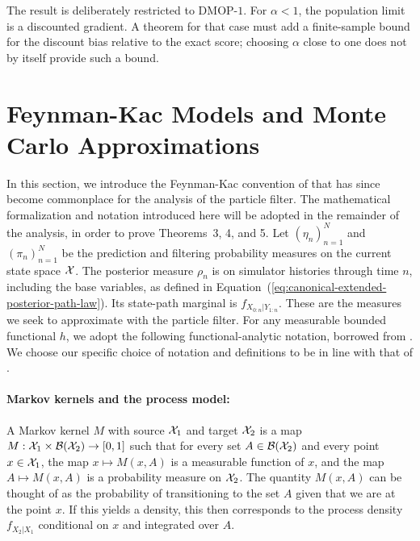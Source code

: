 \documentclass[11pt]{article}
\newcommand\thmMopTargeting{3}
\newcommand\thmMopGradConsistency{4}
\newcommand\thmMopBiasvar{5}
\theoremstyle{thmstylethree}%
\begin{document}
The result is deliberately restricted to DMOP-$1$.  For $\alpha<1$, the
population limit is a discounted gradient.  A theorem for that case must add a
finite-sample bound for the discount bias relative to the exact score; choosing
$\alpha$ close to one does not by itself provide such a bound.




\section{Feynman-Kac Models and Monte Carlo Approximations}
\label{appendix:feynman}




In this section, we introduce the Feynman-Kac convention of \cite{delMoral04} that has since become commonplace \citep{karjalainen23} for the analysis of the particle filter.
The mathematical formalization and notation introduced here will be adopted in the remainder of the analysis, in order to prove Theorems~{\thmMopTargeting}, \thmMopGradConsistency, and \thmMopBiasvar.
Let $(\eta_n)_{n=1}^N$ and $(\pi_n)_{n=1}^N$ be the prediction and filtering
probability measures on the current state space ${\mathcal{X}}$. The posterior measure
$\rho_n$ is on simulator histories through time $n$, including the base
variables, as defined in Equation~(\ref{eq:canonical-extended-posterior-path-law}).
Its state-path marginal is $f_{X_{0:n}|Y_{1:n}}$. These are the measures
we seek to approximate with the particle filter.
For any measurable bounded functional $h$, we adopt the following functional-analytic notation, borrowed from \cite{delMoral04, chopin20, karjalainen23}.
We choose our specific choice of notation and definitions to be in line with that of \cite{karjalainen23}. 


\paragraph{\bf Markov kernels and the process model:} A Markov kernel $M$ with source ${\mathcal{X}}_1$ and target ${\mathcal{X}}_2$ is a map $M: {\mathcal{X}}_1 \times \mathcal{B}({\mathcal{X}}_2) \to [0,1]$ such that for every set $A \in \mathcal{B}({\mathcal{X}}_2)$ and every point $x \in {\mathcal{X}}_1$, the map $x \mapsto M(x, A)$ is a measurable function of $x$, and the map $A \mapsto M(x,A)$ is a probability measure on ${\mathcal{X}}_2$. The quantity $M(x,A)$ can be thought of as the probability of transitioning to the set $A$ given that we are at the point $x$. If this yields a density, this then corresponds to the process density $f_{X_{2}|X_1}$ conditional on $x$ and integrated over $A$.  
\end{document}
